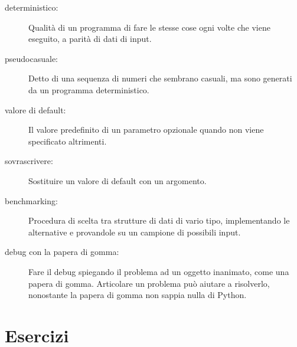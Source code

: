 \documentclass[10pt]{book}
\begin{document}
\begin{description}

\item[deterministico:] Qualità di un programma di fare le stesse cose ogni volte che viene eseguito, a parità di dati di input.

\item[pseudocasuale:] Detto di una sequenza di numeri che sembrano casuali, ma sono generati da un programma deterministico.

\item[valore di default:] Il valore predefinito di un parametro opzionale quando non viene specificato altrimenti.

\item[sovrascrivere:] Sostituire un valore di default con un argomento.

\item[benchmarking:] Procedura di scelta tra strutture di dati di vario tipo, implementando le alternative e provandole su un campione di possibili input.

\item[debug con la papera di gomma:] Fare il debug spiegando il problema ad un oggetto inanimato, come una papera di gomma.  Articolare un problema può aiutare a risolverlo, nonostante la papera di gomma non sappia nulla di Python. 

\end{description}


\section{Esercizi}
\end{document}
